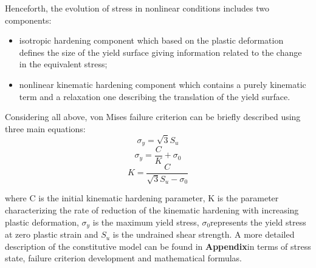\documentclass[10pt,a4paper]{report}
\begin{document}
Henceforth, the evolution of stress in nonlinear conditions includes two components:

\begin{itemize}
	\item 	isotropic hardening component which based on the plastic deformation defines the size of the yield surface giving information related to the change in the equivalent stress;
	\item 	nonlinear kinematic hardening component which contains a purely kinematic term and a relaxation one describing the translation of the yield surface.
	\end{itemize}
	
	
	Considering all above, von Mises failure criterion can be briefly described using three main equations:
\begin{equation}
\sigma_y = \sqrt{3}S_u
\end{equation}
\begin{equation}
\sigma_y = \frac{C}{K}+\sigma_0
\end{equation}
\begin{equation}
K=\frac{C}{\sqrt{3}S_u-\sigma_0}
\end{equation}

where C is the initial kinematic hardening parameter, K is the parameter characterizing the rate of reduction of the kinematic hardening with increasing plastic deformation, $\sigma_y$ is the maximum yield stress, $\sigma_0$represents the yield stress at zero plastic strain and $S_u$ is the undrained shear strength. A more detailed description of the constitutive model can be found in \textbf{Appendix}in terms of stress state, failure criterion development and mathematical formulas.
\end{document}
